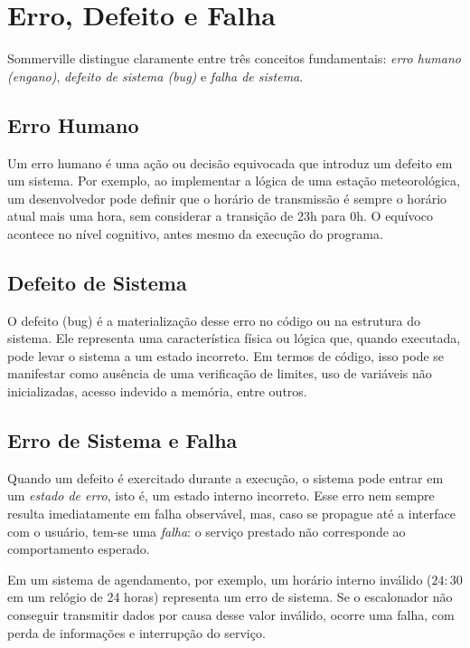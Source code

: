 \documentclass[12pt,a4paper,twoside]{report}
\begin{document}
\section{Erro, Defeito e Falha}

Sommerville distingue claramente entre três conceitos fundamentais:
\emph{erro humano (engano)}, \emph{defeito de sistema (bug)} e
\emph{falha de sistema}.

\subsection{Erro Humano}

Um erro humano é uma ação ou decisão equivocada que introduz um defeito em
um sistema. Por exemplo, ao implementar a lógica de uma estação
meteorológica, um desenvolvedor pode definir que o horário de transmissão é
sempre o horário atual mais uma hora, sem considerar a transição de 23h para
0h. O equívoco acontece no nível cognitivo, antes mesmo da execução do
programa.

\subsection{Defeito de Sistema}

O defeito (bug) é a materialização desse erro no código ou na estrutura do
sistema. Ele representa uma característica física ou lógica que, quando
executada, pode levar o sistema a um estado incorreto. Em termos de código,
isso pode se manifestar como ausência de uma verificação de limites, uso de
variáveis não inicializadas, acesso indevido a memória, entre outros.

\subsection{Erro de Sistema e Falha}

Quando um defeito é exercitado durante a execução, o sistema pode entrar em
um \emph{estado de erro}, isto é, um estado interno incorreto. Esse erro
nem sempre resulta imediatamente em falha observável, mas, caso se propague
até a interface com o usuário, tem-se uma \emph{falha}: o serviço prestado
não corresponde ao comportamento esperado.

Em um sistema de agendamento, por exemplo, um horário interno inválido
(\(24{:}30\) em um relógio de 24 horas) representa um erro de sistema. Se o
escalonador não conseguir transmitir dados por causa desse valor inválido,
ocorre uma falha, com perda de informações e interrupção do serviço.
\end{document}

